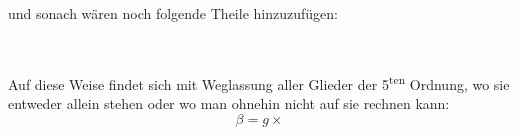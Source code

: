 \noindent und sonach wären noch folgende Theile hinzuzufügen:
\begin{center}
\\[4pt]
\end{center}
\par\noindent\hspace*{\parindent}Auf diese Weise findet sich mit Weglassung aller Glieder der 5\textsuperscript{ten}
Ordnung, wo sie entweder allein stehen oder wo man ohnehin nicht auf sie
rechnen kann:
\[
\beta=g\times
\]
